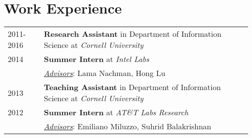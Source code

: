 \documentclass[10pt,fullpage]{article}
\begin{document}
\section*{\textbf{Work Experience}}
\vspace{-1em}
\begin{longtable}{p{0.7in}|p{5.5in}}
	2011-2016 & {\bf Research Assistant} in Department of Information Science at {\it Cornell University} \vspace{0.15cm}\\
	2014 & {\bf Summer Intern} at {\it Intel Labs} \\
		& \underline{{\it Advisors}}: Lama Nachman, Hong Lu \vspace{0.15cm}\\	
	2013 & {\bf Teaching Assistant} in Department of Information Science at {\it Cornell University} \vspace{0.15cm}\\
	2012 & {\bf Summer Intern} at {\it AT\&T Labs Research} \\
		& \underline{{\it Advisors}}: Emiliano Miluzzo, Suhrid Balakrishnan \vspace{0.15cm}\\	

\end{longtable}
\end{document}
